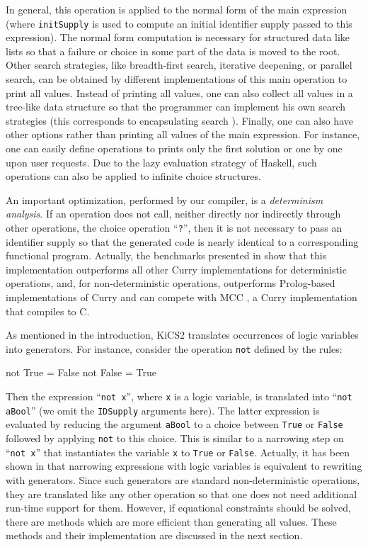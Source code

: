 \documentclass{llncs}
\newcommand{\code}[1]{\mbox{\small\texttt{#1}}}
\newcommand{\ccode}[1]{``\code{#1}''}
\begin{document}
In general, this operation is applied to the normal form
of the main expression (where \code{initSupply} is used to
compute an initial identifier supply passed to this expression).
The normal form computation is necessary for structured data like lists
so that a failure or choice in some part of the data is moved to
the root. Other search strategies, like
breadth-first search, iterative deepening, or parallel search,
can be obtained by different implementations of this main operation
to print all values. Instead of printing all values,
one can also collect all values in a tree-like data structure
so that the programmer can implement his own search strategies
(this corresponds to encapsulating search \cite{BrasselHanusHuch04JFLP}).
Finally, one can also have other options rather than printing all values
of the main expression.
For instance, one can easily define operations
to prints only the first solution or one by one upon user requests.
Due to the lazy evaluation strategy of Haskell,
such operations can also be applied to infinite choice structures.

An important optimization, performed by our compiler,
is a \emph{determinism analysis}.
If an operation does not call, neither directly nor indirectly through
other operations, the choice operation \ccode{?},
then it is not necessary to pass an identifier supply
so that the generated code is nearly identical to a corresponding
functional program.
Actually, the benchmarks presented in \cite{BrasselFischerHanusReck11}
show that this implementation outperforms all other Curry implementations
for deterministic operations,
and, for non-deterministic operations, outperforms Prolog-based
implementations of Curry and can compete with MCC \cite{Lux99FLOPS},
a Curry implementation that compiles to C.

As mentioned in the introduction,
KiCS2 translates occurrences of logic variables
into generators. For instance, consider the operation \code{not}
defined by the rules:
\begin{curry}
  not True  = False
  not False = True
\end{curry}
Then the expression \ccode{not x}, where \code{x} is a logic variable,
is translated into \ccode{not aBool} (we omit the \code{IDSupply} arguments
here). The latter expression is evaluated by reducing the
argument \code{aBool} to a choice between \code{True} or \code{False}
followed by applying \code{not} to this choice.
This is similar to a narrowing step on \ccode{not x}
that instantiates the variable \code{x} to \code{True} or \code{False}.
Actually, it has been shown in \cite{AntoyHanus06ICLP}
that narrowing expressions with logic variables
is equivalent to rewriting with generators.
Since such generators are standard
non-deterministic operations, they are translated like any other operation
so that one does not need additional run-time support for them.
However, if equational constraints should be solved,
there are methods which are more efficient than generating all values.
These methods and their implementation are discussed in the
next section.
\end{document}
